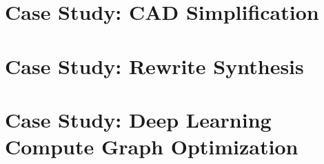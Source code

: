 \documentclass[12pt, oneside]{report}
\begin{document}

\chapter{Case Study: CAD Simplification}
\chapter{Case Study: Rewrite Synthesis}
\chapter{Case Study: Deep Learning Compute Graph Optimization}


\clearpage
{}


\end{document}
